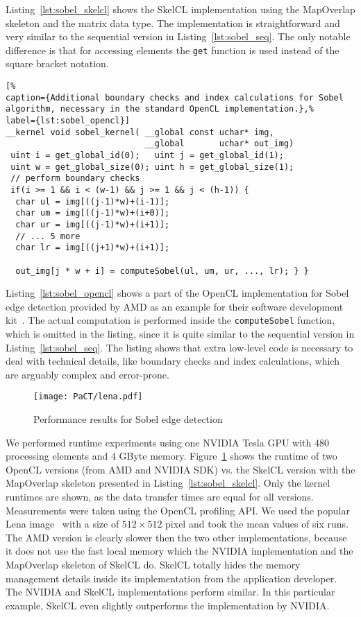 Listing~\ref{lst:sobel_skelcl} shows the SkelCL implementation using the MapOverlap skeleton and the matrix data type.
The implementation is straightforward and very similar to the sequential version in Listing~\ref{lst:sobel_seq}.
The only notable difference is that for accessing elements the \texttt{get} function is used instead of the square bracket notation.

\bigskip
\begin{lstlisting}[%
caption={Additional boundary checks and index calculations for Sobel algorithm, necessary in the standard OpenCL implementation.},%
label={lst:sobel_opencl}]
__kernel void sobel_kernel( __global const uchar* img,
                            __global       uchar* out_img)
 uint i = get_global_id(0);   uint j = get_global_id(1);
 uint w = get_global_size(0); uint h = get_global_size(1);
 // perform boundary checks
 if(i >= 1 && i < (w-1) && j >= 1 && j < (h-1)) {
  char ul = img[((j-1)*w)+(i-1)];
  char um = img[((j-1)*w)+(i+0)];
  char ur = img[((j-1)*w)+(i+1)];
  // ... 5 more
  char lr = img[((j+1)*w)+(i+1)];

  out_img[j * w + i] = computeSobel(ul, um, ur, ..., lr); } }
\end{lstlisting}
\bigskip


Listing~\ref{lst:sobel_opencl} shows a part of the OpenCL implementation for Sobel edge detection provided by AMD as an example for their software development kit~\cite{AMDSDK-13}.
The actual computation is performed inside the \texttt{computeSobel} function, which is omitted in the listing, since it is quite similar to the sequential version in Listing~\ref{lst:sobel_seq}.
The listing shows that extra low-level code is necessary to deal with technical details, like boundary checks and index calculations, which are arguably complex and error-prone.

\begin{figure}[tbp]
  \vspace{.5em}
  \centering
  \texttt{[image: PaCT/lena.pdf]}
  \caption{Performance results for Sobel edge detection}
  \label{fig:measurements}
  \vspace{-1em}
\end{figure}
We performed runtime experiments using one NVIDIA Tesla GPU with 480 processing elements and 4 GByte memory.
Figure~\ref{fig:measurements} shows the runtime of two OpenCL versions (from AMD and NVIDIA SDK) vs. the SkelCL version with the MapOverlap skeleton presented in Listing~\ref{lst:sobel_skelcl}.
Only the kernel runtimes are shown, as the data transfer times are equal for all versions.
Measurements were taken using the OpenCL profiling API.
We used the popular Lena image~\cite{Lena} with a size of $512\times 512$ pixel and took the mean values of six runs.
The AMD version is clearly slower then the two other implementations, because it does not use the fast local memory which the NVIDIA implementation and the MapOverlap skeleton of SkelCL do.
SkelCL totally hides the memory management details inside its implementation from the application developer.
The NVIDIA and SkelCL implementations perform similar.
In this particular example, SkelCL even slightly outperforms the implementation by NVIDIA.

